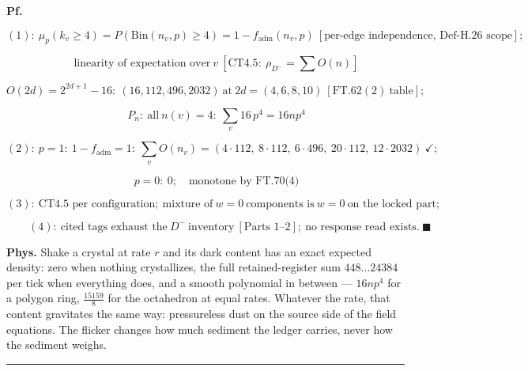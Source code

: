 \begin{theorem}
\textbf{Pf.}

\[
(1):\ \mu_p(k_v\ge4)=P(\mathrm{Bin}(n_v,p)\ge4)=1-f_{\mathrm{adm}}(n_v,p)\ [\text{per-edge independence, Def-H.26 scope}];
\]

\[
\qquad \text{linearity of expectation over}\ v\ [\mathrm{CT4.5}:\ \rho_{D^-}=\textstyle\sum O(n)]
\]

\[
O(2d)=2^{2d+1}-16:\ (16,112,496,2032)\ \text{at}\ 2d=(4,6,8,10)\ [\mathrm{FT.62}(2)\ \text{table}];
\]

\[
\qquad P_n:\ \text{all}\ n(v)=4:\ \textstyle\sum_v16\,p^4=16np^4
\]

\[
(2):\ p{=}1:\ 1-f_{\mathrm{adm}}=1:\ \textstyle\sum_vO(n_v)=(4\cdot112,\ 8\cdot112,\ 6\cdot496,\ 20\cdot112,\ 12\cdot2032)\ \checkmark;
\]

\[
\qquad p{=}0:\ 0;\quad\text{monotone by FT.70(4)}
\]

\[
(3):\ \text{CT4.5 per configuration};\ \text{mixture of}\ w{=}0\ \text{components is}\ w{=}0\ \text{on the locked part};
\]

\[
\qquad (4):\ \text{cited tags exhaust the}\ D^-\ \text{inventory}\ [\text{Parts 1–2}];\ \text{no response read exists}.\ \blacksquare
\]

\textbf{Phys.} Shake a crystal at rate $r$ and its dark content has an exact expected density: zero when nothing crystallizes, the full retained-register sum $448\ldots24384$ per tick when everything does, and a smooth polynomial in between — $16np^4$ for a polygon ring, $\tfrac{15159}{8}$ for the octahedron at equal rates. Whatever the rate, that content gravitates the same way: pressureless dust on the source side of the field equations. The flicker changes how much sediment the ledger carries, never how the sediment weighs.

\vspace{2pt}\noindent\rule{\textwidth}{0.4pt}\vspace{2pt}

\end{theorem}


